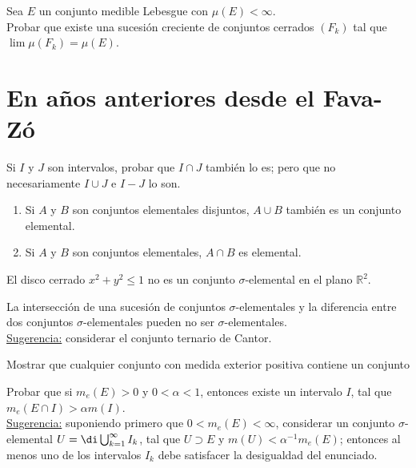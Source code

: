 \documentclass{book}
\newcommand{\rr}{\mathbb{R}}
\begin{document}
\begin{ejer}{} 
 Sea  $E$ un conjunto medible Lebesgue con $\mu(E)<\infty$.\\
Probar que existe una sucesi\'on creciente de conjuntos cerrados $(F_k)$ tal que
$\lim \mu(F_k)=\mu (E)$.
\end{ejer} 


\section{En a\~nos anteriores desde el Fava-Z\'o}


\begin{ejer} {}
Si $I$ y $J$ son intervalos, probar que $I \cap J$ también lo es; pero que 
  no necesariamente $I \cup J$ e $I-J$ lo son. 
 \end{ejer}
  
 \begin{ejer}{}
	\begin{enumerate}
  \item Si $A$ y $B$ son conjuntos elementales disjuntos, $A \cup B$ también es 
  un conjunto elemental.
  \item Si $A$  y $B$ son conjuntos elementales, $A \cap B$ es elemental.
	\end{enumerate}
\end{ejer}
	
\begin{ejer}{}
  El disco cerrado $x^2+y^2\leq 1$ no es un conjunto $\sigma$-elemental en el plano
  $\rr^2$.
	\end{ejer}

  \begin{ejer}{} 
	La intersección de una sucesión de conjuntos $\sigma$-elementales y la diferencia 
  entre dos conjuntos $\sigma$-elementales pueden no ser $\sigma$-elementales.
 \\
  \underline{Sugerencia:} considerar el conjunto ternario de Cantor.
\end{ejer}


 \begin{ejer}{} 
	Mostrar que cualquier conjunto con medida exterior positiva contiene un conjunto 
	\end{ejer}
 
  \begin{ejer}{} 
	Probar que si $m_e(E)>0$ y $0<\alpha<1$, entonces existe un intervalo $I$, tal que
  $m_e(E\cap I)>\alpha m(I)$.
\\
  \underline{Sugerencia:} suponiendo primero que $0<m_e(E)<\infty$, considerar un conjunto
  $\sigma$-elemental $U=\di\bigcup_{k=1}^{\infty}I_k$, tal que 
  $U\supset E$ y $m(U)<\alpha^{-1} m_e(E)$; entonces al menos uno de los intervalos $I_k$
  debe satisfacer la desigualdad del enunciado.
 \end{ejer} 
\end{document}
